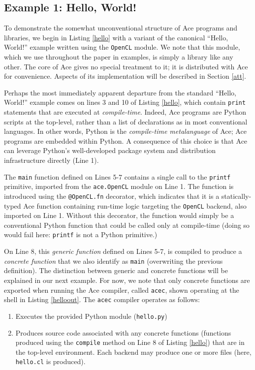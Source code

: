 \documentclass{sig-alternate}
\begin{document}
\subsection{Example 1: Hello, World!}
To demonstrate the somewhat unconventional structure of Ace programs and libraries, we begin in Listing \ref{hello} with a variant of the canonical ``Hello, World!'' example written using the \verb|OpenCL| module. We note that this module, which we use throughout the paper in examples, is simply a library like any other. The core of Ace gives no special treatment to it; it is distributed with Ace for convenience. Aspects of its implementation will be described in Section \ref{att}.

Perhaps the most immediately apparent departure from the standard ``Hello, World!'' example comes on lines 3 and 10 of Listing \ref{hello}, which contain \verb|print| statements that are executed at {\em compile-time}. Indeed, Ace programs are Python scripts at the top-level, rather than a list of declarations as in most conventional languages. In other words, Python is the {\em compile-time metalanguage} of Ace; Ace programs are embedded within Python. A consequence of this choice is that Ace can leverage Python's well-developed package system and  distribution infrastructure directly (Line 1). 

The \verb|main| function defined on Lines 5-7 contains a single call to the \verb|printf| primitive, imported from the \verb|ace.OpenCL| module on Line 1. The function is introduced using the \verb|@OpenCL.fn| decorator, which indicates that it is a statically-typed Ace function containing run-time logic targeting the \verb|OpenCL| backend, also imported on Line 1. Without this decorator, the function would simply be a conventional Python function that could be called only at compile-time (doing so would fail here: \verb|printf| is not a Python primitive.)

On Line 8, this {\em generic function} defined on Lines 5-7, is compiled to produce a {\em concrete function} that we also identify as \verb|main| (overwriting the previous definition). The distinction between generic and concrete functions will be explained in our next example. For now, we note that only concrete functions are exported when running the Ace compiler, called \verb|acec|, shown operating at the shell in Listing \ref{helloout}. The \verb|acec| compiler operates as follows:
\begin{enumerate}
\item Executes the provided Python module (\verb|hello.py|)
\item Produces source code associated with any concrete functions (functions produced using the \verb|compile| method on Line 8 of Listing \ref{hello}) that are in the top-level environment. Each backend may produce one or more files (here, \verb|hello.cl| is produced).
\end{enumerate}
\end{document}
